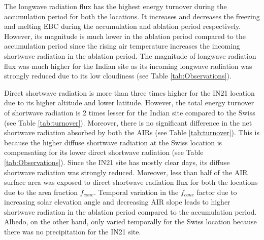\documentclass[utf8]{frontiersSCNS}
\begin{document}
The longwave radiation flux has the highest energy turnover during the accumulation period for both the
locations. It increases and decreases the freezing and melting EBC during the accumulation and ablation period
respectively. However, its magnitude is much lower in the ablation period compared to the accumulation period
since the rising air temperature increases the incoming shortwave radiation in the ablation period. The
magnitude of longwave radiation flux was much higher for the Indian site as its incoming longwave radiation was
strongly reduced due to its low cloudiness (see Table \ref{tab:Observations}).

Direct shortwave radiation is more than three times higher for the IN21 location due to its higher altitude and
lower latitude. However, the total energy turnover of shortwave radiation is 2 times lesser for the Indian site
compared to the Swiss (see Table \ref{tab:turnover}). Moreover, there is no significant difference in the net
shortwave radiation absorbed by both the AIRs (see Table \ref{tab:turnover}). This is because the higher diffuse
shortwave radiation at the Swiss location is compensating for its lower direct shortwave radiation (see Table
\ref{tab:Observations}). Since the IN21 site has mostly clear days, its diffuse shortwave radiation was strongly
reduced. Moreover, less than half of the AIR surface area was exposed to direct shortwave radiation flux for
both the locations due to the area fraction $f_{cone}$. Temporal variation in the $f_{cone}$ factor due to
increasing solar elevation angle and decreasing AIR slope leads to higher shortwave radiation in the ablation
period compared to the accumulation period. Albedo, on the other hand, only varied temporally for the Swiss
location because there was no precipitation for the IN21 site.
\end{document}
